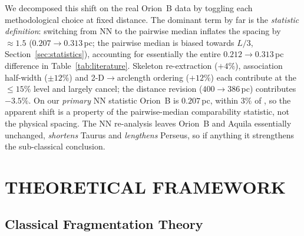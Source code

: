 \documentclass[usenatbib,twoside,twocolumn]{mnras}
\begin{document}
We decomposed this shift on the real Orion~B data by toggling each methodological choice at fixed distance. The dominant term by far is the \emph{statistic definition}: switching from NN to the pairwise median inflates the spacing by $\approx1.5$ ($0.207\to0.313$\,pc; the pairwise median is biased towards $L/3$, Section~\ref{sec:statistics}), accounting for essentially the entire $0.212\to0.313$\,pc difference in Table~\ref{tab:literature}. Skeleton re-extraction ($+4\%$), association half-width ($\pm12\%$) and 2-D$\to$arclength ordering ($+12\%$) each contribute at the $\le15\%$ level and largely cancel; the distance revision ($400\to386$\,pc) contributes $-3.5\%$. On our \emph{primary} NN statistic Orion~B is $0.207$\,pc, within $3\%$ of \citet{Konyves2020}, so the apparent shift is a property of the pairwise-median comparability statistic, not the physical spacing. The NN re-analysis leaves Orion~B and Aquila essentially unchanged, \emph{shortens} Taurus and \emph{lengthens} Perseus, so if anything it strengthens the sub-classical conclusion.

\section{THEORETICAL FRAMEWORK}
\label{sec:theory}

\subsection{Classical Fragmentation Theory}
\end{document}

